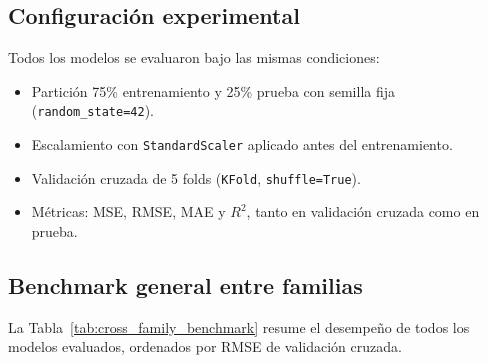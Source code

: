 \subsection{Configuración experimental}

Todos los modelos se evaluaron bajo las mismas condiciones:
\begin{itemize}
    \item Partición 75\% entrenamiento y 25\% prueba con semilla fija (\texttt{random\_state=42}).
    \item Escalamiento con \texttt{StandardScaler} aplicado antes del entrenamiento.
    \item Validación cruzada de 5 folds (\texttt{KFold}, \texttt{shuffle=True}).
    \item Métricas: MSE, RMSE, MAE y $R^2$, tanto en validación cruzada como en prueba.
\end{itemize}

\subsection{Benchmark general entre familias}

La Tabla~\ref{tab:cross_family_benchmark} resume el desempeño de todos los modelos evaluados, ordenados por RMSE de validación cruzada.

